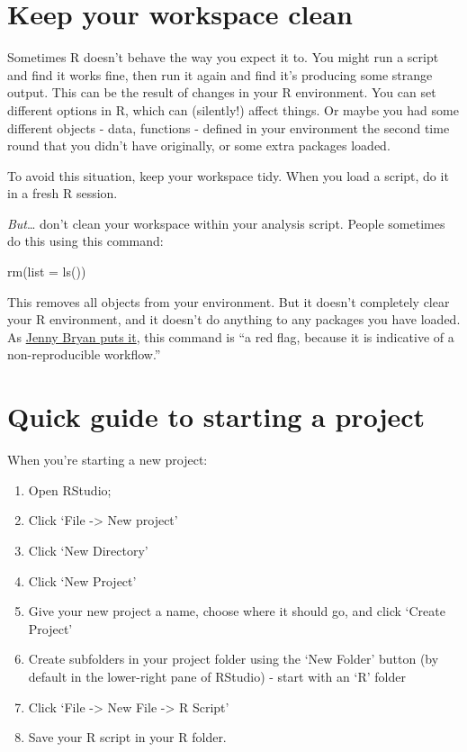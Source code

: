 \documentclass[
]{book}
\newenvironment{Shaded}{\begin{snugshade}}{\end{snugshade}}
\newcommand{\AttributeTok}[1]{\textcolor[rgb]{0.77,0.63,0.00}{#1}}
\newcommand{\FunctionTok}[1]{\textcolor[rgb]{0.00,0.00,0.00}{#1}}
\newcommand{\NormalTok}[1]{#1}
\providecommand{\tightlist}{%
  \setlength{\itemsep}{0pt}\setlength{\parskip}{0pt}}
\begin{document}
\hypertarget{clean-workspace}{%
\section{Keep your workspace clean}\label{clean-workspace}}

Sometimes R doesn't behave the way you expect it to. You might run a script and find it works fine, then run it again and find it's producing some strange output. This can be the result of changes in your R environment. You can set different options in R, which can (silently!) affect things. Or maybe you had some different objects - data, functions - defined in your environment the second time round that you didn't have originally, or some extra packages loaded.

To avoid this situation, keep your workspace tidy. When you load a script, do it in a fresh R session.

\emph{But}\ldots{} don't clean your workspace within your analysis script. People sometimes do this using this command:

\begin{Shaded}
\begin{Highlighting}[]
\FunctionTok{rm}\NormalTok{(}\AttributeTok{list =} \FunctionTok{ls}\NormalTok{())}
\end{Highlighting}
\end{Shaded}

This removes all objects from your environment. But it doesn't completely clear your R environment, and it doesn't do anything to any packages you have loaded. As \href{https://rstats.wtf/save-source.html\#rm-list-ls}{Jenny Bryan puts it}, this command is ``a red flag, because it is indicative of a non-reproducible workflow.''

\hypertarget{quick-guide}{%
\section{Quick guide to starting a project}\label{quick-guide}}

When you're starting a new project:

\begin{enumerate}
\def\labelenumi{\arabic{enumi}.}
\tightlist
\item
  Open RStudio;
\item
  Click `File -\textgreater{} New project'
\item
  Click `New Directory'
\item
  Click `New Project'
\item
  Give your new project a name, choose where it should go, and click `Create Project'
\item
  Create subfolders in your project folder using the `New Folder' button (by default in the lower-right pane of RStudio) - start with an `R' folder
\item
  Click `File -\textgreater{} New File -\textgreater{} R Script'
\item
  Save your R script in your R folder.
\end{enumerate}
\end{document}
